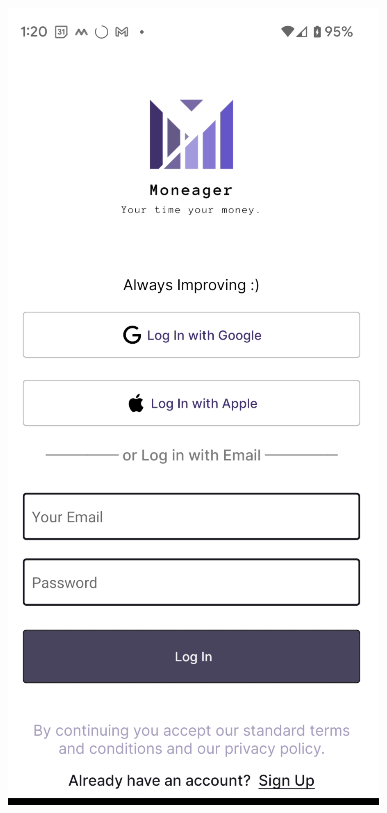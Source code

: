 \begin{figure}[htbp]
    \centering
    \begin{minipage}[t]{0.35\textwidth}
        \centering
        \includegraphics[width=\textwidth]{Screen Shots/Moneager/ScreenShotLogin.png}

\end{minipage}
\end{figure}
